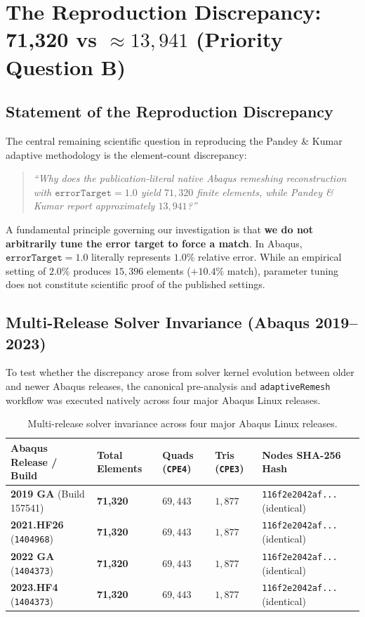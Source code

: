 \section{The Reproduction Discrepancy: 71,320 vs \texorpdfstring{$\approx 13{,}941$}{approx. 13,941} (Priority Question B)}
\label{sec:discrepancy_audit_71k_vs_14k}

\subsection{Statement of the Reproduction Discrepancy}
The central remaining scientific question in reproducing the Pandey \& Kumar \citep{Pandey2025} adaptive methodology is the element-count discrepancy:
\begin{quote}
\emph{``Why does the publication-literal native Abaqus remeshing reconstruction with $\texttt{errorTarget}=1.0$ yield $71{,}320$ finite elements, while Pandey \& Kumar report approximately $13{,}941$?''}
\end{quote}
A fundamental principle governing our investigation is that \textbf{we do not arbitrarily tune the error target to force a match}. In Abaqus, $\texttt{errorTarget}=1.0$ literally represents $1.0\%$ relative error. While an empirical setting of $2.0\%$ produces $15{,}396$ elements ($+10.4\%$ match), parameter tuning does not constitute scientific proof of the published settings.

\subsection{Multi-Release Solver Invariance (Abaqus 2019--2023)}
To test whether the discrepancy arose from solver kernel evolution between older and newer Abaqus releases, the canonical pre-analysis and \texttt{adaptiveRemesh} workflow was executed natively across four major Abaqus Linux releases.

\begin{table}[htbp]
  \centering
  \footnotesize
  \caption{Multi-release solver invariance across four major Abaqus Linux releases.}
  \label{tab:release_invariance}
  \begin{tabularx}{\textwidth}{L{38mm} C{22mm} C{22mm} C{22mm} C{28mm}}
    \toprule
    \textbf{Abaqus Release / Build} & \textbf{Total Elements} & \textbf{Quads (\texttt{CPE4})} & \textbf{Tris (\texttt{CPE3})} & \textbf{Nodes SHA-256 Hash} \\
    \midrule
    \textbf{2019 GA} (Build 157541) & \textbf{71,320} & $69{,}443$ & $1{,}877$ & \texttt{116f2e2042af...} (identical) \\
    \textbf{2021.HF26} (\texttt{1404968}) & \textbf{71,320} & $69{,}443$ & $1{,}877$ & \texttt{116f2e2042af...} (identical) \\
    \textbf{2022 GA} (\texttt{1404373}) & \textbf{71,320} & $69{,}443$ & $1{,}877$ & \texttt{116f2e2042af...} (identical) \\
    \textbf{2023.HF4} (\texttt{1404373}) & \textbf{71,320} & $69{,}443$ & $1{,}877$ & \texttt{116f2e2042af...} (identical) \\
    \bottomrule
  \end{tabularx}
\end{table}

